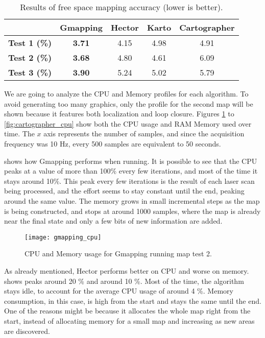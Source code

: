 \begin{table}[!ht]
\centering
\renewcommand*{\arraystretch}{1.1}
\begin{tabular}{c|c|c|c|c}
& \textbf{Gmapping} & \textbf{Hector} & \textbf{Karto} & \textbf{Cartographer} \\ \hline
\textbf{Test 1 (\%)} & \textbf{3.71} & 4.15 & 4.98 & 4.91 \\
\textbf{Test 2 (\%)} & \textbf{3.68} & 4.80 & 4.61 & 6.09 \\
\textbf{Test 3 (\%)} & \textbf{3.90} & 5.24 & 5.02 & 5.79 \\
 \hline
\end{tabular}
\caption{Results of free space mapping accuracy (lower is better).}
\label{tab:results_whitespace}
\end{table}

We are going to analyze the CPU and Memory profiles for each algorithm. To avoid generating too many graphics, only the profile for the second map will be shown because it features both localization and loop closure. Figures \ref{fig:gmapping_cpu} to \ref{fig:cartographer_cpu} show both the CPU usage and RAM Memory used over time. The $x$ axis represents the number of samples, and since the acquisition frequency was 10 Hz, every 500 samples are equivalent to 50 seconds.

 shows how Gmapping performs when running. It is possible to see that the CPU peaks at a value of more than 100\% every few iterations, and most of the time it stays around 10\%. This peak every few iterations is the result of each laser scan being processed, and the effort seems to stay constant until the end, peaking around the same value. The memory grows in small incremental steps as the map is being constructed, and stops at around 1000 samples, where the map is already near the final state and only a few bits of new information are added.

\begin{figure}[!ht]
    \centering
    \texttt{[image: gmapping\_cpu]}
    \caption{CPU and Memory usage for Gmapping running map test 2.}
    \label{fig:gmapping_cpu}
\end{figure}

As already mentioned, Hector performs better on CPU and worse on memory.  shows peaks around 20 \% and around 10 \%. Most of the time, the algorithm stays idle, to account for the average CPU usage of around 4 \%. Memory consumption, in this case, is high from the start and stays the same until the end. One of the reasons might be because it allocates the whole map right from the start, instead of allocating memory for a small map and increasing as new areas are discovered.

